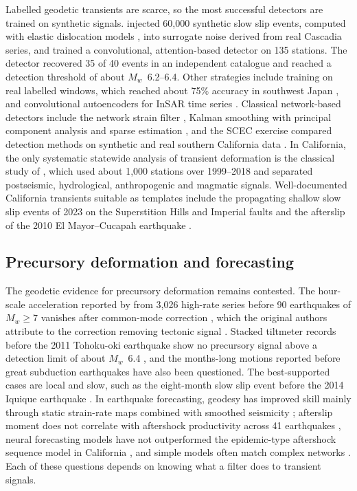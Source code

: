 \documentclass[11pt,a4paper]{article}
\begin{document}
Labelled geodetic transients are scarce, so the most successful detectors are trained on synthetic signals. \citet{costantino2023} injected 60,000 synthetic slow slip events, computed with elastic dislocation models \citep{okada1992}, into surrogate noise derived from real Cascadia series, and trained a convolutional, attention-based detector on 135 stations. The detector recovered 35 of 40 events in an independent catalogue \citep{michel2019} and reached a detection threshold of about $M_w$~6.2--6.4. Other strategies include training on real labelled windows, which reached about 75\% accuracy in southwest Japan \citep{tanaka2025}, and convolutional autoencoders for InSAR time series \citep{rouetleduc2021}. Classical network-based detectors include the network strain filter \citep{ohtani2010}, Kalman smoothing with principal component analysis \citep{jiherring2013} and sparse estimation \citep{riel2014}, and the SCEC exercise compared detection methods on synthetic and real southern California data \citep{lohmanmurray2013}. In California, the only systematic statewide analysis of transient deformation is the classical study of \citet{klein2019}, which used about 1,000 stations over 1999--2018 and separated postseismic, hydrological, anthropogenic and magmatic signals. Well-documented California transients suitable as templates include the propagating shallow slow slip events of 2023 on the Superstition Hills and Imperial faults \citep{materna2024} and the afterslip of the 2010 El Mayor--Cucapah earthquake \citep{gonzalezortega2014}.

\subsection{Precursory deformation and forecasting}

The geodetic evidence for precursory deformation remains contested. The hour-scale acceleration reported by \citet{bletery2023} from 3,026 high-rate series before 90 earthquakes of $M_w \geq 7$ vanishes after common-mode correction \citep{bradley2023}, which the original authors attribute to the correction removing tectonic signal \citep{bletery2025}. Stacked tiltmeter records before the 2011 Tohoku-oki earthquake show no precursory signal above a detection limit of about $M_w$~6.4 \citep{hirose2024}, and the months-long motions reported before great subduction earthquakes \citep{bedford2020} have also been questioned. The best-supported cases are local and slow, such as the eight-month slow slip event before the 2014 Iquique earthquake \citep{socquet2017}. In earthquake forecasting, geodesy has improved skill mainly through static strain-rate maps combined with smoothed seismicity \citep{strader2018,bayona2021}; afterslip moment does not correlate with aftershock productivity across 41 earthquakes \citep{churchill2022}, neural forecasting models have not outperformed the epidemic-type aftershock sequence model in California \citep{stockman2024}, and simple models often match complex networks \citep{mignan2019,mignan2020}. Each of these questions depends on knowing what a filter does to transient signals.
\end{document}
